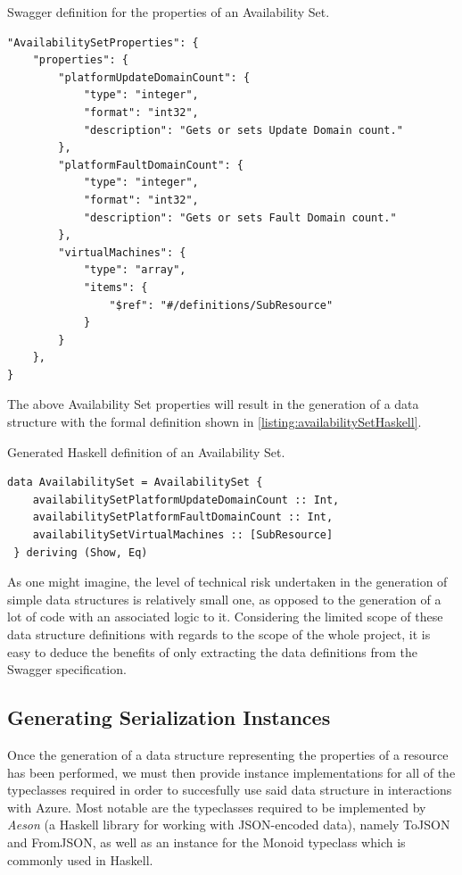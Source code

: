 \documentclass[11pt]{report}
\begin{document}
\begin{listing}[H]
\caption{Swagger definition for the properties of an Availability Set.}
\label{listing:availabilitySetPropertiesSwagger}
\begin{verbatim}
"AvailabilitySetProperties": {
    "properties": {
        "platformUpdateDomainCount": {
            "type": "integer",
            "format": "int32",
            "description": "Gets or sets Update Domain count."
        },
        "platformFaultDomainCount": {
            "type": "integer",
            "format": "int32",
            "description": "Gets or sets Fault Domain count."
        },
        "virtualMachines": {
            "type": "array",
            "items": {
                "$ref": "#/definitions/SubResource"
            }
        }
    },
}
\end{verbatim}
\end{listing}

The above Availability Set properties will result in the generation of a
data structure with the formal definition shown in
\autoref{listing:availabilitySetHaskell}.

\begin{listing}[H]
\caption{Generated Haskell definition of an Availability Set.}
\label{listing:availabilitySetHaskell}
\begin{verbatim}
data AvailabilitySet = AvailabilitySet {
    availabilitySetPlatformUpdateDomainCount :: Int,
    availabilitySetPlatformFaultDomainCount :: Int,
    availabilitySetVirtualMachines :: [SubResource]
 } deriving (Show, Eq)
\end{verbatim}
\end{listing}

As one might imagine, the level of technical risk undertaken in the generation
of simple data structures is relatively small one, as opposed to the generation
of a lot of code with an associated logic to it. Considering the limited scope
of these data structure definitions with regards to the scope of the whole
project, it is easy to deduce the benefits of only extracting the data
definitions from the Swagger specification.

\subsection{Generating Serialization Instances}

Once the generation of a data structure representing the properties of a
resource has been performed, we must then provide instance implementations for
all of the typeclasses required in order to succesfully use said data structure
in interactions with Azure. Most notable are the typeclasses required to be
implemented by  \textit{Aeson} (a Haskell library for working with JSON-encoded
data), namely ToJSON and FromJSON, as well as an instance for the Monoid
typeclass which is commonly used in Haskell.
\end{document}
